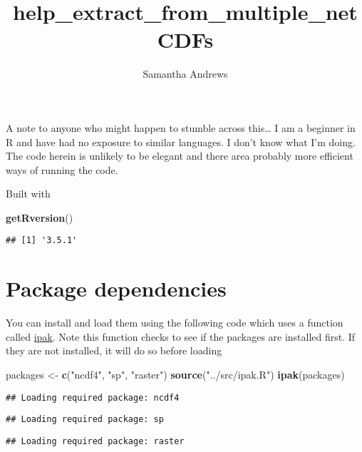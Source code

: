\documentclass[]{article}
\title{help\_extract\_from\_multiple\_netCDFs}
\author{Samantha Andrews}
\date{}
\newenvironment{Shaded}{\begin{snugshade}}{\end{snugshade}}
\newcommand{\KeywordTok}[1]{\textcolor[rgb]{0.13,0.29,0.53}{\textbf{#1}}}
\newcommand{\StringTok}[1]{\textcolor[rgb]{0.31,0.60,0.02}{#1}}
\newcommand{\NormalTok}[1]{#1}
\begin{document}
\maketitle

A note to anyone who might happen to stumble across this\ldots{} I am a
beginner in R and have had no exposure to similar languages. I don't
know what I'm doing. The code herein is unlikely to be elegant and there
area probably more efficient ways of running the code.

Built with

\begin{Shaded}
\begin{Highlighting}[]
\KeywordTok{getRversion}\NormalTok{()}
\end{Highlighting}
\end{Shaded}

\begin{verbatim}
## [1] '3.5.1'
\end{verbatim}

\section{Package dependencies}\label{package-dependencies}

You can install and load them using the following code which uses a
function called
\href{https://gist.github.com/stevenworthington/3178163}{ipak}. Note
this function checks to see if the packages are installed first. If they
are not installed, it will do so before loading

\begin{Shaded}
\begin{Highlighting}[]
\NormalTok{packages <-}\StringTok{ }\KeywordTok{c}\NormalTok{(}\StringTok{"ncdf4"}\NormalTok{, }\StringTok{"sp"}\NormalTok{, }\StringTok{"raster"}\NormalTok{) }
\KeywordTok{source}\NormalTok{(}\StringTok{"../src/ipak.R"}\NormalTok{)}
\KeywordTok{ipak}\NormalTok{(packages)}
\end{Highlighting}
\end{Shaded}

\begin{verbatim}
## Loading required package: ncdf4
\end{verbatim}

\begin{verbatim}
## Loading required package: sp
\end{verbatim}

\begin{verbatim}
## Loading required package: raster
\end{verbatim}
\end{document}
